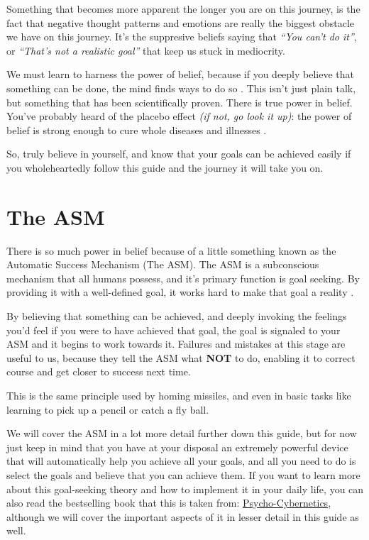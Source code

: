 \documentclass[
]{book}
\begin{document}
Something that becomes more apparent the longer you are on this journey, is the fact that negative thought patterns and emotions are really the biggest obstacle we have on this journey. It's the suppresive beliefs saying that \emph{``You can't do it''}, or \emph{``That's not a realistic goal''} that keep us stuck in mediocrity.

We must learn to harness the power of belief, because if you deeply believe that something can be done, the mind finds ways to do so \citep{power_of_belief}. This isn't just plain talk, but something that has been scientifically proven. There is true power in belief. You've probably heard of the placebo effect \emph{(if not, go look it up)}: the power of belief is strong enough to cure whole diseases and illnesses \citep{placebo_effect}.

So, truly believe in yourself, and know that your goals can be achieved easily if you wholeheartedly follow this guide and the journey it will take you on.

\hypertarget{the-asm}{%
\section{The ASM}\label{the-asm}}

There is so much power in belief because of a little something known as the Automatic Success Mechanism (The ASM). The ASM is a subconscious mechanism that all humans possess, and it's primary function is goal seeking. By providing it with a well-defined goal, it works hard to make that goal a reality \citep{asm}.

By believing that something can be achieved, and deeply invoking the feelings you'd feel if you were to have achieved that goal, the goal is signaled to your ASM and it begins to work towards it. Failures and mistakes at this stage are useful to us, because they tell the ASM what \textbf{NOT} to do, enabling it to correct course and get closer to success next time.

This is the same principle used by homing missiles, and even in basic tasks like learning to pick up a pencil or catch a fly ball.

We will cover the ASM in a lot more detail further down this guide, but for now just keep in mind that you have at your disposal an extremely powerful device that will automatically help you achieve all your goals, and all you need to do is select the goals and believe that you can achieve them. If you want to learn more about this goal-seeking theory and how to implement it in your daily life, you can also read the bestselling book that this is taken from: \href{https://ia601903.us.archive.org/26/items/TheNewPsychoCyberneticsByMaxwellMaltz1/The\%20New\%20Psycho-Cybernetics\%20by\%20Maxwell\%20Maltz\%20\%20\%281\%29.pdf}{Psycho-Cybernetics}, although we will cover the important aspects of it in lesser detail in this guide as well.
\end{document}

